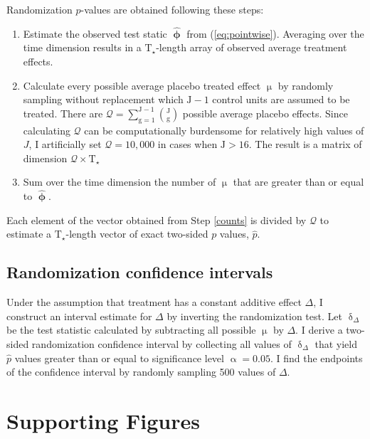 Randomization $p$-values are obtained following these steps:

\begin{enumerate} 
	\item Estimate the observed test static $\boldsymbol{\hat{\upphi}}$ from (\ref{eq:pointwise}). Averaging over the time dimension results in a $\text{T}_\star$-length array of observed average treatment effects. 
	\item Calculate every possible average placebo treated effect $\upmu$ by randomly sampling without replacement which $\text{J}-1$ control units are assumed to be treated. There are $\mathcal{Q} = \sum\limits_{\text{g}=1}^{\text{J}-1} {\text{J} \choose \text{g}}$ possible average placebo effects. Since calculating $\mathcal{Q}$ can be computationally burdensome for relatively high values of $J$, I artificially set $\mathcal{Q} = 10,000$ in cases when $\text{J} > 16$. The result is a matrix of dimension $\mathcal{Q} \times \text{T}_\star$
	\item Sum over the time dimension the number of $\upmu$ that are greater than or equal to $\boldsymbol{\hat{\upphi}}$.  \label{counts}
\end{enumerate}

Each element of the vector obtained from Step \ref{counts} is divided by $\mathcal{Q}$ to estimate a $\text{T}_\star$-length vector of exact two-sided $p$ values, $\hat{p}$. 

\subsection{Randomization confidence intervals}

Under the assumption that treatment has a constant additive effect $\Delta$, I construct an interval estimate for $\Delta$ by inverting the randomization test. Let $\updelta_\Delta$ be the test statistic calculated by subtracting all possible $\upmu$ by $\Delta$. I derive a two-sided randomization confidence interval by collecting all values of $\updelta_\Delta$ that yield $\hat{p}$ values greater than or equal to significance level $\upalpha=0.05$. I find the endpoints of the confidence interval by randomly sampling 500 values of $\Delta$.

\clearpage
\section{Supporting Figures}

